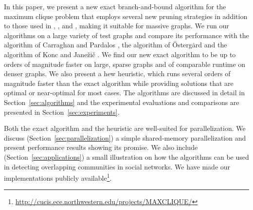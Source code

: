 
In this paper, we present a new exact branch-and-bound
algorithm for the maximum clique problem that employs 
several new pruning strategies in addition to those used in \cite{pardalos},
\cite{ostergard},  \cite{citeulike:7905505} and \cite{konc2007improved},
making it suitable for massive graphs.
We run our algorithms on a large variety of test graphs and compare its performance with the
algorithm of Carraghan and Pardalos \cite{pardalos}, the algorithm of \"{O}sterg\.{a}rd \cite{ostergard} and the algorithm of Konc and Jane\v{z}i\v{c} \cite{konc2007improved}. 
We find our new exact algorithm to be up to orders of magnitude faster on large,
sparse graphs and of comparable runtime on denser graphs.
We also present a hew heuristic, which runs several orders of magnitude faster than the exact algorithm while providing solutions that are optimal or near-optimal for most cases.
The algorithms are discussed in detail in Section~\ref{sec:algorithms} and the experimental evaluations and comparisons are presented in Section~\ref{sec:experiments}. 

Both the exact algorithm and the heuristic are well-suited for parallelization.
We discuss (Section~\ref{sec:parallelization}) a simple shared-memory parallelization and present performance 
results showing its promise. We also include (Section~\ref{sec:applications})
a small illustration on how the algorithms can be used in detecting overlapping communities in social networks.
We have made our implementations publicly available\footnote{\url{http://cucis.ece.northwestern.edu/projects/MAXCLIQUE/}}.


